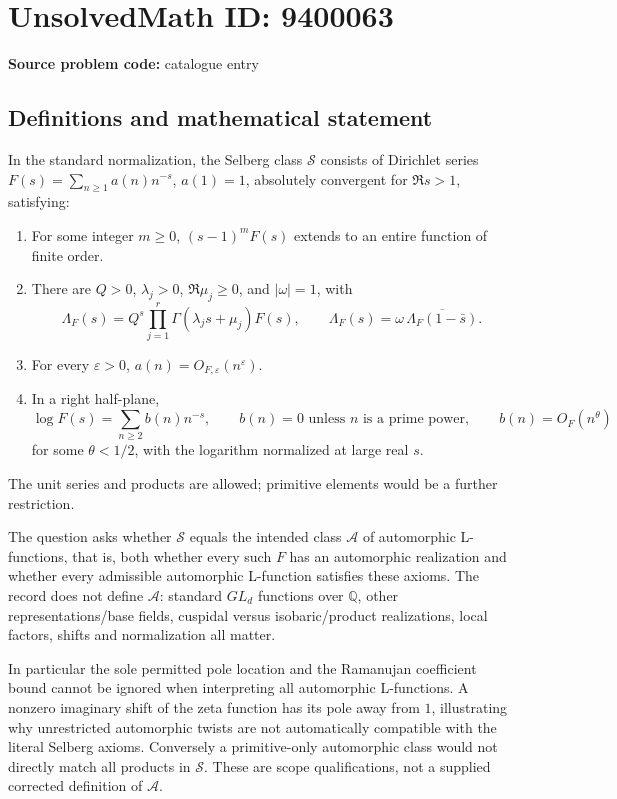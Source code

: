 \documentclass[11pt]{article}
\newcommand{\Q}{\mathbb{Q}}
\begin{document}
\section*{UnsolvedMath ID: 9400063}
\textbf{Source problem code:} catalogue entry
\subsection{Definitions and mathematical statement}
In the standard normalization, the Selberg class \(\mathcal S\) consists of Dirichlet series \(F(s)=\sum_{n\ge1}a(n)n^{-s}\), \(a(1)=1\), absolutely convergent for \(\Re s>1\), satisfying:
\begin{enumerate}
\item For some integer \(m\ge0\), \((s-1)^mF(s)\) extends to an entire function of finite order.
\item There are \(Q>0\), \(\lambda_j>0\), \(\Re\mu_j\ge0\), and \(|\omega|=1\), with
\[
\Lambda_F(s)=Q^s\prod_{j=1}^{r}\Gamma(\lambda_js+\mu_j)F(s),
\qquad\Lambda_F(s)=\omega\,\overline{\Lambda_F(1-\bar s)}.
\]
\item For every \(\varepsilon>0\), \(a(n)=O_{F,\varepsilon}(n^\varepsilon)\).
\item In a right half-plane,
\[
\log F(s)=\sum_{n\ge2}b(n)n^{-s},\qquad
b(n)=0\text{ unless }n\text{ is a prime power},\qquad
b(n)=O_F(n^\theta)
\]
for some \(\theta<1/2\), with the logarithm normalized at large real \(s\).
\end{enumerate}
The unit series and products are allowed; primitive elements would be a further restriction.

The question asks whether \(\mathcal S\) equals the intended class \(\mathcal A\) of automorphic L-functions, that is, both whether every such \(F\) has an automorphic realization and whether every admissible automorphic L-function satisfies these axioms. The record does not define \(\mathcal A\): standard \(GL_d\) functions over \(\Q\), other representations/base fields, cuspidal versus isobaric/product realizations, local factors, shifts and normalization all matter.

In particular the sole permitted pole location and the Ramanujan coefficient bound cannot be ignored when interpreting all automorphic L-functions. A nonzero imaginary shift of the zeta function has its pole away from \(1\), illustrating why unrestricted automorphic twists are not automatically compatible with the literal Selberg axioms. Conversely a primitive-only automorphic class would not directly match all products in \(\mathcal S\). These are scope qualifications, not a supplied corrected definition of \(\mathcal A\).
\end{document}
